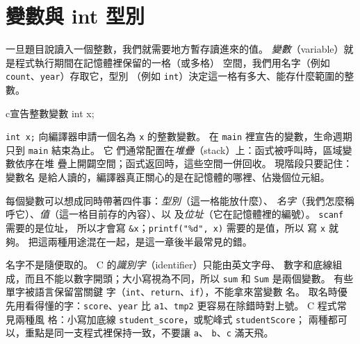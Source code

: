 \section{變數與 int 型別}
\label{sec:basic-int-vars}

一旦題目說讀入一個整數，我們就需要地方暫存讀進來的值。
\emph{變數}（variable）就是程式執行期間在記憶體裡保留的一格（或多格）
空間，我們用名字（例如 \texttt{count}、\texttt{year}）存取它，型別
（例如 \texttt{int}）決定這一格有多大、能存什麼範圍的整數。

\begin{code}{c}{宣告整數變數}
int x;
\end{code}

\texttt{int x;} 向編譯器申請一個名為 \texttt{x} 的整數變數。 在
\texttt{main} 裡宣告的變數，生命週期只到 \texttt{main} 結束為止。 它
們通常配置在\emph{堆疊}（stack）上：函式被呼叫時，區域變數依序在堆
疊上開闢空間；函式返回時，這些空間一併回收。 現階段只要記住：變數名
是給人讀的，編譯器真正關心的是在記憶體的哪裡、佔幾個位元組。

每個變數可以想成同時帶著四件事：\emph{型別}（這一格能放什麼）、
\emph{名字}（我們怎麼稱呼它）、\emph{值}（這一格目前存的內容）、以
及\emph{位址}（它在記憶體裡的編號）。 \texttt{scanf} 需要的是位址，
所以才會寫 \texttt{\&x}；\texttt{printf("\%d", x)} 需要的是值，所以
寫 \texttt{x} 就夠。 把這兩種用途混在一起，是這一章後半最常見的錯。

名字不是隨便取的。 C 的\emph{識別字}（identifier）只能由英文字母、
數字和底線組成，而且不能以數字開頭；大小寫視為不同，所以
\texttt{sum} 和 \texttt{Sum} 是兩個變數。 有些單字被語言保留當關鍵
字（\texttt{int}、\texttt{return}、\texttt{if}），不能拿來當變數
名。 取名時優先用看得懂的字：\texttt{score}、\texttt{year} 比
\texttt{a1}、\texttt{tmp2} 更容易在除錯時對上號。 C 程式常見兩種風
格：小寫加底線 \texttt{student\_score}，或駝峰式 \texttt{studentScore}；
兩種都可以，重點是同一支程式裡保持一致，不要讓 \texttt{a}、
\texttt{b}、\texttt{c} 滿天飛。

\begin{center}
\label{fig:ch02-variable-box}
\end{center}

